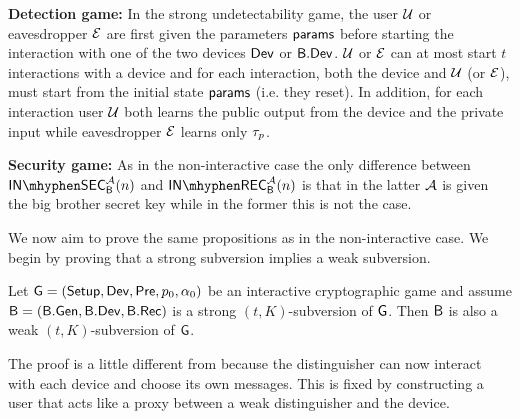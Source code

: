 \noindent\textbf{Detection game:} In the strong undetectability game, the user $\mathcal{U}$ or eavesdropper $\mathcal{E}$ are first given the parameters $\mathsf{params}$ before starting the interaction with one of the two devices $\operatorname{\mathsf{Dev}}$ or $\mathsf{B}.\mathsf{Dev}$. $\mathcal{U}$ or $\mathcal{E}$ can at most start $t$ interactions with a device and for each interaction, both the device and $\mathcal{U}$ (or $\mathcal{E}$), must start from the initial state $\mathsf{params}$ (i.e. they reset). In addition, for each interaction user $\mathcal{U}$ both learns the public output from the device and the private input while eavesdropper $\mathcal{E}$ learns only $\tau_p$.

\noindent\textbf{Security game:} As in the non-interactive case the only difference between $\insecgame_{\bb}^{\adve}(n)$ and $\inrecgame_{\bb}^{\adve}(n)$ is that in the latter $\mathcal{A}$ is given the big brother secret key while in the former this is not the case. 

We now aim to prove the same propositions as in the non-interactive case. We begin by proving that a strong subversion implies a weak subversion. 

\begin{prop}
Let $\operatorname{\mathsf{G}}=\left(\operatorname{\mathsf{Setup}},\operatorname{\mathsf{Dev}},\operatorname{\mathsf{Pre}},p_{0},\alpha_{0}\right)$ be an interactive cryptographic game and assume $\mathsf{B} = \left(\mathsf{B}.\mathsf{Gen},\mathsf{B}.\mathsf{Dev},\mathsf{B}.\mathsf{Rec}\right)$ is a strong $(t,K)$-subversion of $\operatorname{\mathsf{G}}$. Then $\mathsf{B}$ is also a weak $(t,K)$-subversion of $\operatorname{\mathsf{G}}$. 
\end{prop}

The proof is a little different from   because the distinguisher can now interact with each device and choose its own messages. This is fixed by constructing a user that acts like a proxy between a weak distinguisher and the device. 

